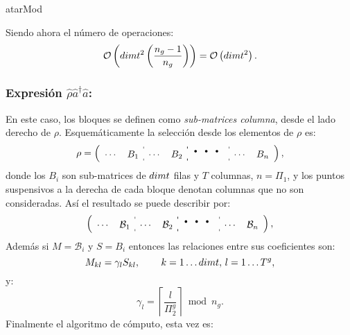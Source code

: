 \begin{algorithm}[H]
\caption{atarMod}\label{algo:atarMod}
\LinesNumbered
{}
\end{algorithm}
\quad Siendo ahora el n\'umero de operaciones: $$\mathcal{O}\left(dimt^2\left(\frac{n_g-1}{n_g}\right)\right)=\mathcal{O}\left(dimt^2\right).$$
\subsubsection*{Expresi\'on $\hat{\rho}\hat{a}^{\dag}\hat{a}$: } En este caso, los bloques se definen como \emph{sub-matrices columna}, desde el lado derecho de $\rho$. Esquem\'aticamente la selecci\'on desde los elementos de $\rho$ es:\begin{equation}\rho=\left(
\begin{array}{cc:cc:cc:cc}
 \cdots&B_1 & \cdots & B_2& \multicolumn{2}{:c:}{\mbox{\Huge$\cdots$}} &\cdots&B_n
\end{array}\right),
\end{equation}
donde los $B_i$ son sub-matrices de $dimt$ filas y $T$ columnas, $n=\Pi_1$, y los puntos suspensivos a la derecha de cada bloque denotan columnas que no son consideradas. As\'i el resultado se puede describir por:\begin{equation}\left(
\begin{array}{cc:cc:cc:cc}
 \cdots&\mathcal{B}_1 & \cdots & \mathcal{B}_2& \multicolumn{2}{:c:}{\mbox{\Huge$\cdots$}} &\cdots&\mathcal{B}_n
\end{array}\right),
\end{equation}
\quad Adem\'as si $M=\mathcal{B}_{i}$ y $S=B_{i}$ entonces las relaciones entre sus coeficientes son:\begin{equation}
M_{kl}=\gamma_{l}S_{kl},\,\qquad k=1\ldots dimt,\,l=1\ldots T^g, \label{ec:subbloque_rataM}
\end{equation}
y:\begin{equation}
 \gamma_{l}=\left\lceil \frac{l}{\Pi_2^g} \right\rceil\bmod n_g.\label{ec:coef_gammas_rataMod}
\end{equation}
\quad Finalmente el algoritmo de c\'omputo, esta vez es:

